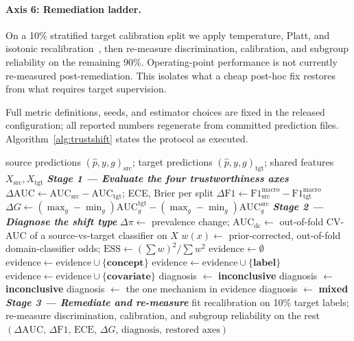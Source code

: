 \documentclass[11pt]{article}
\begin{document}
\paragraph{Axis 6: Remediation ladder.} On a 10\% stratified target calibration split we apply
temperature, Platt, and isotonic recalibration~\citep{zadrozny2002isotonic}, then re-measure
discrimination, calibration, and subgroup reliability on the remaining 90\%. Operating-point
performance is not currently re-measured post-remediation. This isolates what a cheap post-hoc fix
restores from what requires target supervision.

Full metric definitions, seeds, and estimator choices are fixed in the released configuration;
all reported numbers regenerate from committed prediction files. Algorithm~\ref{alg:trustshift}
states the protocol as executed.

\begin{algorithm}[t]
\caption{The TrustShift audit}
\label{alg:trustshift}
\begin{algorithmic}[1]
\Require source predictions $(\hat p, y, g)_{\text{src}}$; target predictions $(\hat p, y, g)_{\text{tgt}}$; shared features $X_{\text{src}}, X_{\text{tgt}}$
\Statex \textit{\textbf{Stage 1 --- Evaluate the four trustworthiness axes}}
\State $\Delta\text{AUC} \gets \text{AUC}_{\text{src}} - \text{AUC}_{\text{tgt}}$; \; ECE, Brier per split 
\State $\Delta\text{F1} \gets \text{F1}^{\text{macro}}_{\text{src}} - \text{F1}^{\text{macro}}_{\text{tgt}}$ 
\State $\Delta G \gets (\max_g\!-\!\min_g)\text{AUC}_g^{\text{tgt}} - (\max_g\!-\!\min_g)\text{AUC}_g^{\text{src}}$ 
\Statex \textit{\textbf{Stage 2 --- Diagnose the shift type}}
\State $\Delta\pi \gets$ prevalence change; \; $\text{AUC}_{\text{dc}} \gets$ out-of-fold CV-AUC of a source-vs-target classifier on $X$
\State $w(x) \gets$ prior-corrected, out-of-fold domain-classifier odds; $\text{ESS} \gets (\sum w)^2/\sum w^2$
\State $\text{evidence} \gets \emptyset$
 $\text{evidence} \gets \text{evidence} \cup \{\textbf{concept}\}$ \EndIf
{} $\text{evidence} \gets \text{evidence} \cup \{\textbf{label}\}$ \EndIf
{} $\text{evidence} \gets \text{evidence} \cup \{\textbf{covariate}\}$ \EndIf
{} diagnosis $\gets$ \textbf{inconclusive}
 diagnosis $\gets$ \textbf{inconclusive}
 diagnosis $\gets$ the one mechanism in evidence
\Else{} diagnosis $\gets$ \textbf{mixed} \EndIf
\Statex \textit{\textbf{Stage 3 --- Remediate and re-measure}}
\State fit recalibration on 10\% target labels; re-measure discrimination, calibration, and
subgroup reliability on the rest 
\Ensure $(\Delta\text{AUC},\, \Delta\text{F1},\, \text{ECE},\, \Delta G,\, \text{diagnosis},\, \text{restored axes})$
\end{algorithmic}
\end{algorithm}
\end{document}
